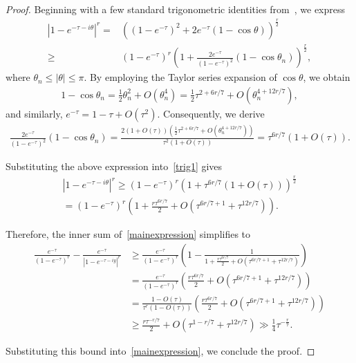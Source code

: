 \documentclass[12pt, oneside,reqno]{amsart}
\numberwithin{equation}{section}
\begin{document}
\begin{proof}

\medskip

Beginning with a few standard trigonometric identities from~\cite{lichen}, we express
\begin{align}\label{trig1}
\left|1-e^{-\tau-i\theta}\right|^{r}
=&((1-e^{-\tau})^2+2e^{-\tau}(1-\cos\theta))^{\tfrac{r}{2}}\nonumber\\
\geq & (1-e^{-\tau})^{r}\left(1+\frac{2e^{-\tau}}{(1-e^{-\tau})^2}(1-\cos\theta_n)\right)^{\tfrac{r}{2}},
\end{align}
where $\theta_n\leq |\theta|\leq \pi$. By employing the Taylor series expansion of $\cos{\theta}$, we obtain
\begin{align*}
1-\cos\theta_n
=\frac{1}{2}\theta_n^2+O(\theta_n^4)
=\frac{1}{2}\tau^{2+{6r}/{7}}+O(\theta_n^{4+12r/7}),
\end{align*}
and similarly, $e^{-\tau}=1-\tau+O(\tau^2)$. Consequently, we derive
\begin{align*}
\frac{2e^{-\tau}}{(1-e^{-\tau})^2}(1-\cos\theta_n)
=\frac{2(1+O(\tau))(\tfrac{1}{2}\tau^{2+{6r}/{7}}+O(\theta_n^{4+12r/7}))}{\tau^2(1+O(\tau))}
=\tau^{{6r}/{7}}(1+O(\tau)).
\end{align*}

\medskip
\noindent
Substituting the above expression into~\eqref{trig1} gives
\begin{align*}
\left|1-e^{-\tau-i\theta}\right|^{r}
\geq (1-e^{-\tau})^{r}\left(1+\tau^{{6r}/{7}}(1+O(\tau))\right)^{\tfrac{r}{2}}\\
=(1-e^{-\tau})^{r}\left(1+\frac{r\tau^{{6r}/{7}
}}{2}+O\left(\tau^{{6r}/{7}+1}+\tau^{{12r}/{7}}\right)\right).
\end{align*}

\noindent
Therefore, the inner sum of~\eqref{mainexpression} simplifies to
\begin{align*}
\frac{e^{-\tau}}{(1-e^{-\tau})^{r}}-\frac{e^{-\tau}}{\left|1-e^{-\tau-iy}\right|^{r}}
&\geq\frac{e^{-\tau}}{(1-e^{-\tau})^{r}}\left(1-\frac{1}{1+\frac{r\tau^{{6r}/{7}}}{2}+O\left(\tau^{{6r}/{7}+1}+\tau^{{12r}/{7}}\right)}\right)\\
&=\frac{e^{-\tau}}{(1-e^{-\tau})^{r}}\left(\frac{r\tau^{{6r}/{7}}}{2}+O\left(\tau^{{6r}/{7}+1}+\tau^{{12r}/{7}}\right)\right)\\
&=\frac{1-O(\tau)}{\tau^{r}(1-O(\tau))}\left(\frac{r\tau^{{6r}/{7}}}{2}+O\left(\tau^{{6r}/{7}+1}+\tau^{{12r}/{7}}\right)\right)\\
&\geq\frac{r\tau^{-{r}/{7}}}{2}+O\left(\tau^{1-{r}/{7}}+\tau^{12r/7}\right)
\gg\frac{1}{4}\tau^{-\tfrac{r}{7}}.
\end{align*}

\noindent
Substituting this bound into~\eqref{mainexpression}, we conclude the proof.
\end{proof}
\end{document}
